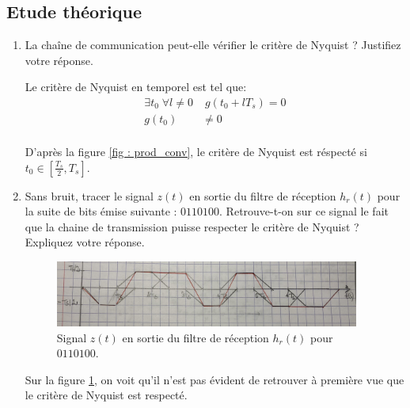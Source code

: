 \documentclass[frenchb]{article}
\begin{document}
\subsection{Etude théorique}

    \begin{enumerate}
        \item La chaîne de communication peut-elle vérifier le critère de Nyquist ? Justifiez votre réponse.
        \par\leavevmode\par
        \setlength\parindent{0.5cm}
        Le critère de Nyquist en temporel est tel que: 
        \begin{equation*}
        \begin{split}
        \exists t_0 \; \forall l \ne 0 & \; g(t_0 + l T_s) = 0 \\   
        g(t_0) & \ne 0 \\
        \end{split}
        \end{equation*}
        
        D'après la figure \ref{fig : prod_conv}, le critère de Nyquist est réspecté si $t_0 \in \left[\frac{T_s}{2}, T_s\right]$. 
        \par\leavevmode\par
        \item Sans bruit, tracer le signal $z(t)$ en sortie du filtre de réception $h_r(t)$ pour la suite de bits émise suivante : $0110100$. Retrouve-t-on sur ce signal le fait que la chaine de transmission puisse respecter le critère de Nyquist ? Expliquez votre réponse.
        
        \begin{figure}[ht!]
		\centering
		\includegraphics[width=10cm]{C2Q2.jpg}		\caption{Signal $z(t)$ en sortie du filtre de réception $h_r(t)$ pour $0110100$. \label{fig : C2Q2}}
		\end{figure}

        \par\leavevmode\par
        \setlength\parindent{0.5cm}
        Sur la figure \ref{fig : C2Q2}, on voit qu'il n'est pas évident de retrouver à première vue que le critère de Nyquist est respecté. 
        \par\leavevmode\par
        

\end{enumerate}
\end{document}
